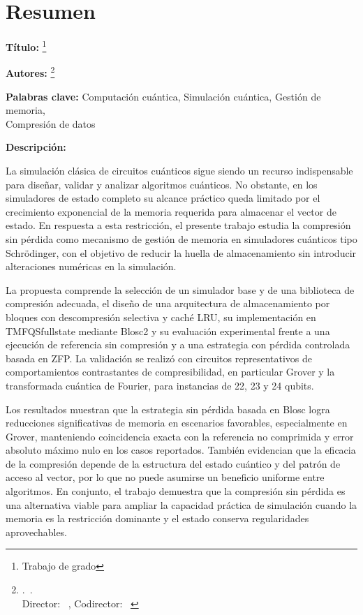 \section*{Resumen}

\textbf{Título:} \tit\footnote{Trabajo de grado}

\textbf{Autores:} \nam\footnote{\fac.\ \esc.\\ Director: \tdir\ \dir, Codirector: \tcdir\ \cdir }

\textbf{Palabras clave:} { Computación cuántica, Simulación cuántica, Gestión de memoria,\\ Compresión de datos }

\textbf{Descripción:}

La simulación clásica de circuitos cuánticos sigue siendo un recurso indispensable para diseñar, validar y analizar algoritmos cuánticos. No obstante, en los simuladores de estado completo su alcance práctico queda limitado por el crecimiento exponencial de la memoria requerida para almacenar el vector de estado. En respuesta a esta restricción, el presente trabajo estudia la compresión sin pérdida como mecanismo de gestión de memoria en simuladores cuánticos tipo Schr\"odinger, con el objetivo de reducir la huella de almacenamiento sin introducir alteraciones numéricas en la simulación.

La propuesta comprende la selección de un simulador base y de una biblioteca de compresión adecuada, el diseño de una arquitectura de almacenamiento por bloques con descompresión selectiva y caché LRU, su implementación en TMFQSfullstate mediante Blosc2 y su evaluación experimental frente a una ejecución de referencia sin compresión y a una estrategia con pérdida controlada basada en ZFP. La validación se realizó con circuitos representativos de comportamientos contrastantes de compresibilidad, en particular Grover y la transformada cuántica de Fourier, para instancias de 22, 23 y 24 qubits.

Los resultados muestran que la estrategia sin pérdida basada en Blosc logra reducciones significativas de memoria en escenarios favorables, especialmente en Grover, manteniendo coincidencia exacta con la referencia no comprimida y error absoluto máximo nulo en los casos reportados. También evidencian que la eficacia de la compresión depende de la estructura del estado cuántico y del patrón de acceso al vector, por lo que no puede asumirse un beneficio uniforme entre algoritmos. En conjunto, el trabajo demuestra que la compresión sin pérdida es una alternativa viable para ampliar la capacidad práctica de simulación cuando la memoria es la restricción dominante y el estado conserva regularidades aprovechables.

